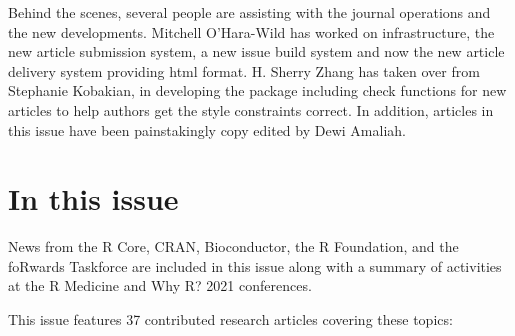 Behind the scenes, several people are assisting with the journal
operations and the new developments. Mitchell O'Hara-Wild has worked on
infrastructure, the new article submission system, a new issue build
system and now the new article delivery system providing html format. H.
Sherry Zhang has taken over from Stephanie Kobakian, in developing the
 package including check functions for new articles to help
authors get the style constraints correct. In addition, articles in this
issue have been painstakingly copy edited by Dewi Amaliah.

\hypertarget{in-this-issue}{%
\section{In this issue}\label{in-this-issue}}

News from the R Core, CRAN, Bioconductor, the R Foundation, and the
foRwards Taskforce are included in this issue along with a summary of
activities at the R Medicine and Why R? 2021 conferences.

This issue features 37 contributed research articles covering these
topics:

